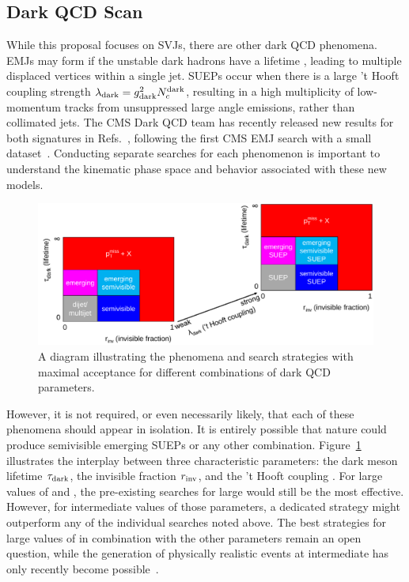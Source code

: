 \subsection{Dark QCD Scan}\label{subsec:darkscan}

While this proposal focuses on SVJs, there are other dark QCD phenomena.
EMJs may form if the unstable dark hadrons have a lifetime \taudark, leading to multiple displaced vertices within a single jet.
SUEPs occur when there is a large 't Hooft coupling strength $\lambda_\text{dark} = g_{\mathrm{dark}}^2 N_{c}^{\text{dark}}$,
resulting in a high multiplicity of low-momentum tracks from unsuppressed large angle emissions, rather than collimated jets.
The CMS Dark QCD team has recently released new results for both signatures in Refs.~\cite{CMS:2023vpb,CMS:2024emj},
following the first CMS EMJ search with a small dataset~\cite{Sirunyan:2018njd}.
Conducting separate searches for each phenomenon is important to understand the kinematic phase space and behavior associated with these new models.

\begin{figure}[htb!]
\centering
\includegraphics[width=0.95\myfigurewidth]{figures/svj_acceptance_diagram_v7.pdf}
\caption{A diagram illustrating the phenomena and search strategies with maximal acceptance for different combinations of dark QCD parameters.}
\label{fig:svjacc}
\end{figure}

However, it is not required, or even necessarily likely, that each of these phenomena should appear in isolation.
It is entirely possible that nature could produce semivisible emerging SUEPs or any other combination.
Figure~\ref{fig:svjacc} illustrates the interplay between three characteristic parameters:
the dark meson lifetime $\tau_\text{dark}$, the invisible fraction $r_{\mathrm{inv}}$, and the 't Hooft coupling \thooft.
For large values of \rinv and \taudark, the pre-existing searches for large \met would still be the most effective.
However, for intermediate values of those parameters, a dedicated strategy might outperform any of the individual searches noted above.
The best strategies for large values of \thooft in combination with the other parameters remain an open question,
while the generation of physically realistic events at intermediate \thooft has only recently become possible~\cite{Cesarotti:2020uod}.

